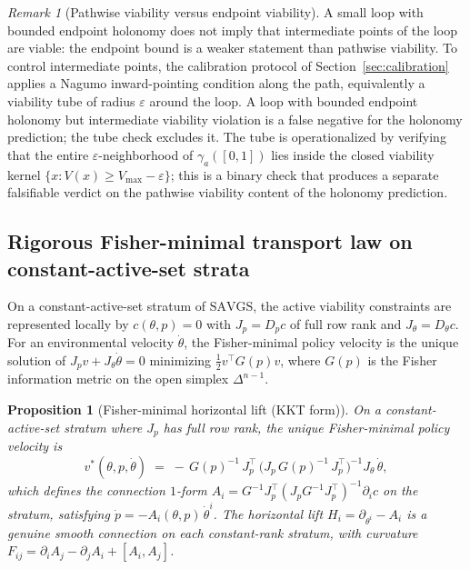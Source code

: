 \documentclass[11pt,a4paper]{article}
\theoremstyle{plain}
\newtheorem{proposition}[theorem]{Proposition}
\theoremstyle{definition}
\theoremstyle{remark}
\newtheorem{remark}[theorem]{Remark}
\newcommand{\SAVGS}{\mathrm{SAVGS}}
\begin{document}
\begin{remark}[Pathwise viability versus endpoint viability]
\label{rem:pathwise}
A small loop with bounded endpoint holonomy does not imply that
intermediate points of the loop are viable: the endpoint bound is a
weaker statement than pathwise viability. To control intermediate
points, the calibration protocol of Section~\ref{sec:calibration}
applies a Nagumo inward-pointing condition along the path, equivalently
a viability tube of radius $\varepsilon$ around the loop. A loop with
bounded endpoint holonomy but intermediate viability violation is a
false negative for the holonomy prediction; the tube check excludes
it. The tube is operationalized by verifying that the entire
$\varepsilon$-neighborhood of $\gamma_a([0,1])$ lies inside the
closed viability kernel
$\{x : V(x)\geq V_{\max}-\varepsilon\}$; this is a binary check that
produces a separate falsifiable verdict on the pathwise viability
content of the holonomy prediction.
\end{remark}

\subsection{Rigorous Fisher-minimal transport law on constant-active-set strata}
\label{sec:fisher-transport}

On a constant-active-set stratum of $\SAVGS$, the active viability
constraints are represented locally by $c(\theta, p) = 0$ with
$J_p = D_p c$ of full row rank and $J_\theta = D_\theta c$. For an
environmental velocity $\dot\theta$, the Fisher-minimal policy
velocity is the unique solution of $J_p v + J_\theta\dot\theta = 0$
minimizing $\tfrac12 v^\top G(p) v$, where $G(p)$ is the Fisher
information metric on the open simplex $\Delta^{n-1}$.

\begin{proposition}[Fisher-minimal horizontal lift (KKT form)]
\label{prop:kkt}
On a constant-active-set stratum where $J_p$ has full row rank, the
unique Fisher-minimal policy velocity is
\begin{equation}\label{eq:kkt}
  v^*(\theta, p, \dot\theta) \;=\;
  -\,G(p)^{-1}\,J_p^{\!\top}\,\bigl(J_p\,G(p)^{-1}\,J_p^{\!\top}\bigr)^{-1}\!J_\theta\,\dot\theta,
\end{equation}
which defines the connection $1$-form
$A_i = G^{-1} J_p^{\!\top}(J_p G^{-1} J_p^{\!\top})^{-1}\partial_i c$
on the stratum, satisfying $\dot p = -A_i(\theta, p)\,\dot\theta^i$.
The horizontal lift $H_i = \partial_{\theta^i} - A_i$ is a genuine
smooth connection on each constant-rank stratum, with curvature
$F_{ij} = \partial_i A_j - \partial_j A_i + [A_i, A_j]$.
\end{proposition}
\end{document}
